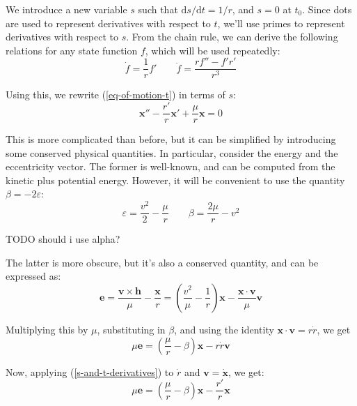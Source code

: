 \documentclass{article}
\numberwithin{equation}{subsection}
\begin{document}
We introduce a new variable $s$ such that $\mathrm{d}s/\mathrm{d}t = 1/r$, and $s = 0$ at $t_0$. Since dots are used to represent derivatives with respect to $t$, we'll use primes to represent derivatives with respect to $s$. From the chain rule, we can derive the following relations for any state function $f$, which will be used repeatedly:
\begin{equation}
\label{s-and-t-derivatives}
\dot f = \frac{1}{r} f' \qquad \ddot f = \frac{r f'' - f' r'}{r^3}
\end{equation}

Using this, we rewrite (\ref{eq-of-motion-t}) in terms of $s$:
\begin{equation}
\label{eq-of-motion-s}
\bm x'' - \frac{r'}{r} \bm x' + \frac{\mu}{r} \bm x = 0
\end{equation}

This is more complicated than before, but it can be simplified by introducing some conserved physical quantities. In particular, consider the energy and the eccentricity vector. The former is well-known, and can be computed from the kinetic plus potential energy. However, it will be convenient to use the quantity $\beta = -2\varepsilon$:
\begin{equation}
\label{energy-def}
\varepsilon = \frac{v^2}{2} - \frac{\mu}{r} \qquad \beta = \frac{2\mu}{r} - v^2
\end{equation}

TODO should i use alpha?

The latter is more obscure, but it's also a conserved quantity, and can be expressed as:
\begin{equation}
\label{eccentricity-def}
\bm e = \frac{\bm v \times \bm h}{\mu} - \frac{\bm x}{r} = \left( \frac{v^2}{\mu} - \frac{1}{r} \right) \bm x - \frac{\bm x \cdot \bm v}{\mu} \bm v
\end{equation}

Multiplying this by $\mu$, substituting in $\beta$, and using the identity $\bm x \cdot \bm v = r \dot{r}$, we get
\begin{equation}
\label{mu-e}
\mu \bm e = \left(\frac{\mu}{r} - \beta \right) \bm x - r \dot{r} \bm v
\end{equation}

Now, applying (\ref{s-and-t-derivatives}) to $\dot{r}$ and $\bm v = \dot{\bm x}$, we get:
\begin{equation}
\mu \bm e = \left(\frac{\mu}{r} - \beta \right) \bm x - \frac{r'}{r} \bm x
\end{equation}
\end{document}
